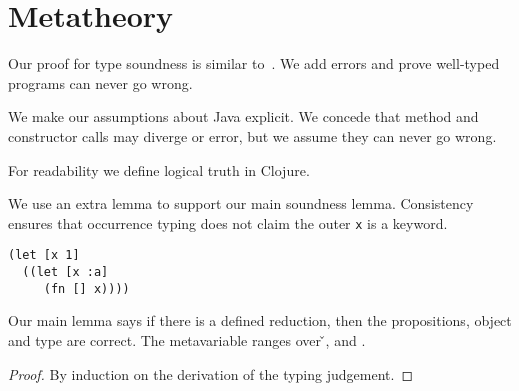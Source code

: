 \section{Metatheory}

Our proof for type soundness is similar to~\cite{TF10}. We add
errors and prove well-typed programs can never go wrong.

We make our assumptions about Java explicit. We concede that
method and constructor calls may diverge or error, but we assume they can
never go wrong.

{\javaassumptionsall}

For readability we define logical truth in Clojure.

{\istruefalsedefinitions}

We use an extra lemma to support our main soundness lemma. Consistency
ensures that occurrence typing does not claim the outer 
\texttt{x} is a keyword. 

\begin{verbatim}
(let [x 1]
  ((let [x :a]
     (fn [] x))))
\end{verbatim}

{\consistentwithdefinition}

Our main lemma says if there is a defined reduction, then the propositions, object
and type are correct.
The metavariable  ranges over \v{}, \errorvalv{} and \wrong{}.

\begin{lemma}\label{lemma:soundness}

  {\soundnesslemmahypothesis}
  \begin{proof}
    By induction on the derivation of the typing judgement.
  \end{proof}
\end{lemma}



{\soundnesstheorem}

{\wrongtheorem}

